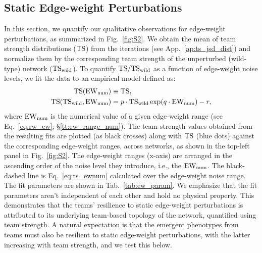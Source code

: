 \subsection{Static Edge-weight Perturbations} \label{sssec:stat_ew}
In this section, we quantify our qualitative observations for edge-weight perturbations, as summarized in Fig.~\ref{fig:S2}. We obtain the mean of team strength distributions ($\mathrm{TS}$) from the iterations (see App.~\ref{ap:ts_jsd_dist}) and normalize them by the corresponding team strength of the unperturbed (wild-type) network ($\mathrm{TS_{wild}}$). To quantify $\mathrm{TS}/\mathrm{TS_{wild}}$ as a function of edge-weight noise levels, we fit the data to an empirical model defined as:
\begin{align}
    \mathrm{TS}(\mathrm{EW_{num}}) &\equiv \mathrm{TS}, \\
    \mathrm{TS}(\mathrm{TS_{wild}},\mathrm{EW_{num}}) &= p\cdot\mathrm{TS_{wild}}\exp(q\cdot\mathrm{EW_{num}}) - r, \label{eq:ts_ewnum}
\end{align}
where $\mathrm{EW_{num}}$ is the numerical value of a given edge-weight range (see Eq.~\ref{eq:rw_ew}; \S\ref{tt:ew_range_num}). The team strength values obtained from the resulting fits are plotted (as black crosses) along with $\mathrm{TS}$ (blue dots) against the corresponding edge-weight ranges, across networks, as shown in the top-left panel in Fig.~\ref{fig:S2}. The edge-weight ranges (x-axis) are arranged in the ascending order of the noise level they introduce, i.e., the $\mathrm{EW_{num}}$. The black-dashed line is Eq.~\ref{eq:ts_ewnum} calculated over the edge-weight noise range. The fit parameters are shown in Tab.~\ref{tab:ew_param}. We emphasize that the fit parameters aren't independent of each other and hold no physical property. This demonstrates that the teams' resilience to static edge-weight perturbations is attributed to its underlying team-based topology of the network, quantified using team strength. A natural expectation is that the emergent phenotypes from teams must also be resilient to static edge-weight perturbations, with the latter increasing with team strength, and we test this below. 

